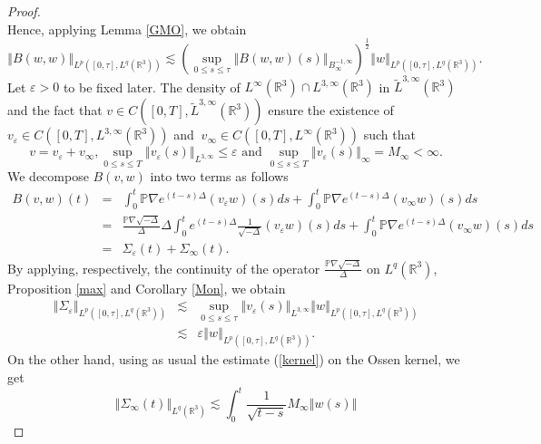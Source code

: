 \documentclass[11pt]{amsart}%
\theoremstyle{plain}
\numberwithin{equation}{section}
\begin{document}
\begin{proof}
\[\]%
Hence, applying Lemma \ref{GMO}, we obtain
\begin{equation}
\left\Vert B(w,w)\right\Vert _{L^{p}([0,\tau ],L^{q}(\mathbb{R}%
^{3}))}\lesssim \left(\sup_{0\leq s\leq \tau }\left\Vert B(w,w)(s)\right\Vert
_{B_{\infty }^{-1,\infty }}\right)^\frac{1}{2}\left\Vert w\right\Vert _{L^{p}([0,\tau ],L^{q}(%
\mathbb{R}^{3}))}.  \label{Est3}
\end{equation}%
Let $\varepsilon >0$ to be fixed later. The density of $L^{\infty }(%
\mathbb{R}^{3})\cap L^{3,\infty }(\mathbb{R}^{3})$ in $\tilde{L}^{3,\infty }(%
\mathbb{R}^{3})$ and the fact that $v\in C([0,T],\tilde{L}^{3,\infty }(%
\mathbb{R}^{3}))$ ensure the existence of $v_{\varepsilon }\in
C([0,T],L^{3,\infty }(\mathbb{R}^{3}))$ and $~v_{\infty }\in
C([0,T],L^{\infty }(\mathbb{R}^{3}))$ such that
\[
v=v_{\varepsilon }+v_{\infty },\sup_{0\leq s\leq T}\left\Vert v_{\varepsilon
}(s)\right\Vert _{L^{3,\infty }}\leq \varepsilon \text{ and }\sup_{0\leq
s\leq T}\left\Vert v_{\varepsilon }(s)\right\Vert _{\infty }=M_{\infty
}<\infty .
\]%
We decompose $B(v,w)$ into two terms as follows
\begin{eqnarray*}
B(v,w)(t)&=&
\int_{0}^{t} \mathbb{P}\nabla e^{(t-s)\Delta }(v_{\varepsilon
}w)(s)ds+\int_{0}^{t}\mathbb{P}\nabla e^{(t-s)\Delta }(v_{\infty
}w)(s)ds\\
&=& \frac{\mathbb{P}\nabla\sqrt{-\Delta }}{\Delta }
\Delta \int_{0}^{t}e^{(t-s)\Delta }\frac{1}{\sqrt{-\Delta }}(v_{\varepsilon
}w)(s)ds+\int_{0}^{t}\mathbb{P}\nabla e^{(t-s)\Delta }(v_{\infty
}w)(s)ds\\
&=& \Sigma_{\varepsilon}(t)+\Sigma_{\infty }(t).
\end{eqnarray*}
By applying, respectively,  the continuity of the operator $\frac{\mathbb{P}\nabla\sqrt{-\Delta }}{\Delta}$ on $ L^{q}(\mathbb{R}^{3})$, Proposition \ref{max} and Corollary \ref{Mon},  we obtain
\begin{eqnarray}
\left\Vert \Sigma_{\varepsilon}\right\Vert _{L^{p}([0,\tau ],L^{q}(\mathbb{R}%
^{3}))} &\lesssim &\sup_{0\leq s\leq \tau }\left\Vert v_{\varepsilon
}(s)\right\Vert _{L^{3,\infty }}\left\Vert w\right\Vert _{L^{p}([0,\tau
],L^{q}(\mathbb{R}^{3}))}  \nonumber \\
&\lesssim &\varepsilon \left\Vert w\right\Vert _{L^{p}([0,\tau ],L^{q}(%
\mathbb{R}^{3}))}.  \label{Est2}
\end{eqnarray}%
On the other hand, using as usual the estimate (\ref{kernel}) on the Ossen kernel, we get
\[\left\Vert \Sigma_{\infty }(t)\right\Vert _{L^{q}(\mathbb{R}^{3})} \lesssim
\int_{0}^{t}\frac{1}{\sqrt{t-s}}M_{\infty }\left\Vert w(s)\right\Vert
\]
\end{proof}
\end{document}
